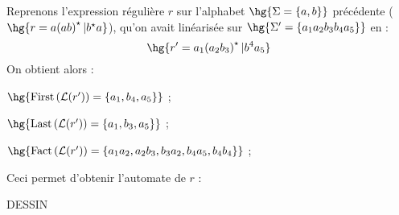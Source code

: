 \documentclass[a4paper,french,bookmarks]{book}
\begin{document}
    \begin{example}{}{}
        Reprenons l'expression régulière $r$ sur l'alphabet $\hg{\Sigma = \ens{a, b}}$ précédente ($\hg{r = a\p{ab}^\star \vert b^\star a}$), qu'on avait linéarisée sur $\hg{\Sigma' = \ens{a_1a_2b_3b_4a_5}}$ en :
        \[ \hg{r' = a_1\p{a_2b_3}^\star \vert b^4a_5 } \]
        On obtient alors :
        \begin{enumerate}
            \itt $\hg{\First{\bcL\p{r'}} = \ens{a_1, b_4, a_5}}$ ;
            
            \itt $\hg{\Last{\bcL\p{r'}} = \ens{a_1, b_3, a_5}}$ ;
            
            \itt $\hg{\Fact{\bcL\p{r'}} = \ens{a_1a_2, a_2b_3, b_3a_2, b_4a_5, b_4b_4}}$ ;
        \end{enumerate}
        Ceci permet d'obtenir l'automate de $r$ :
        \begin{center}
            DESSIN
        \end{center}
    \end{example}
\end{document}
